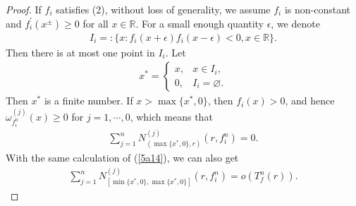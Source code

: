 \documentclass{article}
\begin{document}
\begin{proof}
    If $f_{i}$ satisfies (2), without loss of generality, we assume $f_{i}$ is non-constant and $f_{i}^{'}(x^{\pm})\geq 0$ for all $x\in\mathbb{R}$. For a small enough quantity $\epsilon$, we denote
    \begin{eqnarray*}
        I_{i}=:\{x:f_{i}(x+\epsilon)f_{i}(x-\epsilon)<0, x\in\mathbb{R}\}.
    \end{eqnarray*}
    Then there is at most one point in $I_{i}$. Let
    \begin{eqnarray*}
        x^{*}=\left\{\begin{array}{ll}
         x, & x\in I_{i},\\
         0, & I_{i}= \varnothing.
         \end{array}\right.
    \end{eqnarray*}
    Then $x^{*}$ is a finite number. If $x>\max\{x^{*}, 0\}$, then $f_{i}(x)>0$, and hence $\omega_{f_{i}^{n}}^{(j)}(x)\geq 0$ for $j=1, \cdots, 0$, which means that
    \begin{eqnarray}\label{5a15}
        \sum_{j=1}^{n}N_{(\max\{x^{*}, 0\}, r)}^{(j)}(r, f_{i}^{n})=0.
    \end{eqnarray}
    With the same calculation of (\ref{5a14}), we can also get 
    \begin{eqnarray}\label{5a16}
        \sum_{j=1}^{n}N_{[\min\{x^{*}, 0\}, \max\{x^{*}, 0\}]}^{(j)}(r, f_{i}^{n})=o(T_{f}^{n}(r)).
    \end{eqnarray}
    

\end{proof}
\end{document}
